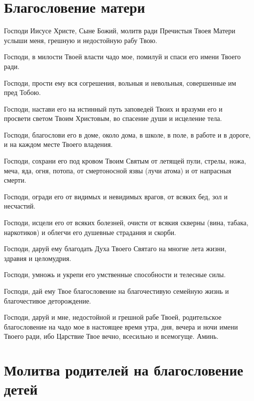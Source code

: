 \section{Благословение матери}\begin{mymulticols}


Господи Иисусе Христе, Сыне Божий, молитв ради Пречистыя Твоея Матери услыши меня, грешную и недостойную рабу Твою.

Господи, в милости Твоей власти чадо мое, помилуй и спаси его имени Твоего ради.

Господи, прости ему вся согрешения, вольныя и невольныя, совершенные им пред Тобою.

Господи, настави его на истинный путь заповедей Твоих и вразуми его и просвети светом Твоим Христовым, во спасение души и исцеление тела.

Господи, благослови его в доме, около дома, в школе, в поле, в работе и в дороге, и на каждом месте Твоего владения.

Господи, сохрани его под кровом Твоим Святым от летящей пули, стрелы, ножа, меча, яда, огня, потопа, от смертоносной язвы (лучи атома) и от напрасныя смерти.

Господи, огради его от видимых и невидимых врагов, от всяких бед, зол и несчастий.

Господи, исцели его от всяких болезней, очисти от всякия скверны (вина, табака, наркотиков) и облегчи его душевные страдания и скорби.

Господи, даруй ему благодать Духа Твоего Святаго на многие лета жизни, здравия и целомудрия.

Господи, умножь и укрепи его умственные способности и телесные силы.

Господи, дай ему Твое благословение на благочестивую семейную жизнь и благочестивое деторождение.

Господи, даруй и мне, недостойной и грешной рабе Твоей, родительское благословение на чадо мое в настоящее время утра, дня, вечера и ночи имени Твоего ради, ибо Царствие Твое вечно, всесильно и всемогуще. Аминь.


\end{mymulticols}

\section{Молитва родителей на благословение детей}

